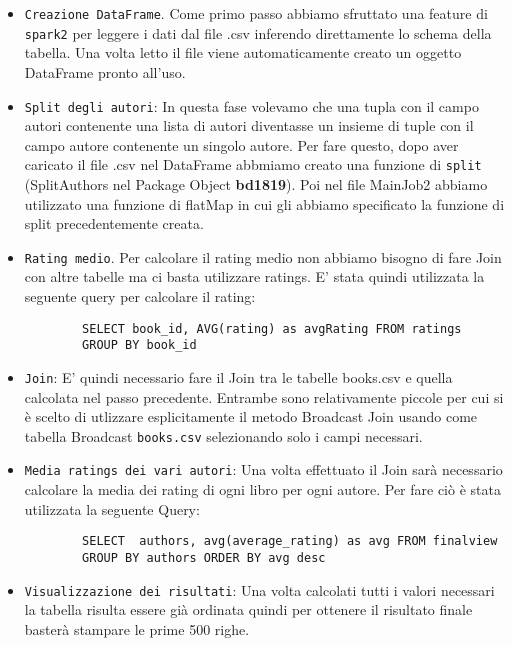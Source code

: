 \begin{itemize}
    \item \texttt{Creazione DataFrame}. Come primo passo abbiamo sfruttato una feature di \texttt{spark2} per leggere
    i dati dal file .csv inferendo direttamente lo schema della tabella. Una volta letto il file viene automaticamente creato
    un oggetto DataFrame pronto all'uso.
    \item \texttt{Split degli autori}: In questa fase volevamo che una tupla con il campo autori contenente una lista di autori diventasse
    un insieme di tuple con il campo autore contenente un singolo autore. Per fare questo, dopo aver caricato il file .csv nel DataFrame
    abbmiamo creato una funzione di \texttt{split} (SplitAuthors nel Package Object \textbf{bd1819}). Poi nel file MainJob2 abbiamo utilizzato una funzione di
    flatMap in cui gli abbiamo specificato la funzione di split precedentemente creata.
    \item  \texttt{Rating medio}. Per calcolare il rating medio non abbiamo bisogno di fare Join con altre tabelle ma ci basta utilizzare
    ratings. E' stata quindi utilizzata la seguente query per calcolare il rating:
    \begin{verbatim}
        SELECT book_id, AVG(rating) as avgRating FROM ratings
        GROUP BY book_id
    \end{verbatim}
    \item \texttt{Join}: E' quindi necessario fare il Join tra le tabelle books.csv e quella calcolata nel passo precedente. Entrambe sono relativamente piccole
    per cui si è scelto di utlizzare esplicitamente il metodo Broadcast Join usando come tabella Broadcast \texttt{books.csv} selezionando solo i campi necessari.
    \item \texttt{Media ratings dei vari autori}: Una volta effettuato il Join sarà necessario calcolare la media dei rating di ogni libro per ogni autore. Per fare ciò
    è stata utilizzata la seguente Query:
    \begin{verbatim}
        SELECT  authors, avg(average_rating) as avg FROM finalview
        GROUP BY authors ORDER BY avg desc
    \end{verbatim}
    \item \texttt{Visualizzazione dei risultati}: Una volta calcolati tutti i valori necessari la tabella risulta essere già ordinata quindi per ottenere il risultato finale
    basterà stampare le prime 500 righe.
\end{itemize}

